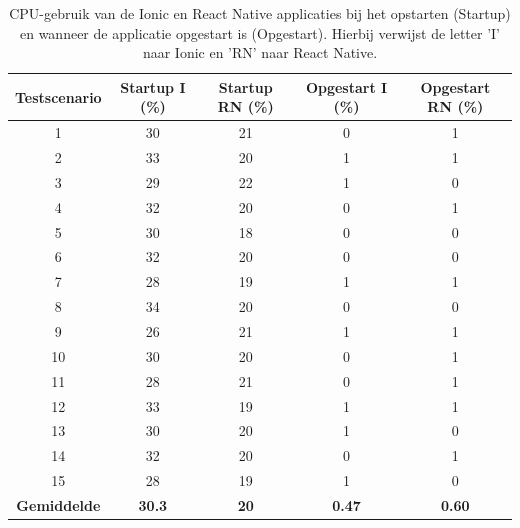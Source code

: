 


\begin{table}[htbp]
  \centering
  \footnotesize
  \begin{tabular}{|c|c|c|c|c|}
      \hline
      \textbf{Testscenario} & \textbf{Startup I (\%)} & \textbf{Startup RN (\%)} & \textbf{Opgestart I (\%)} & \textbf{Opgestart RN (\%)} \\
      \hline
      1 & 30 & 21 & 0 & 1 \\
      \hline
      2 & 33 & 20 & 1 & 1 \\
      \hline
      3 & 29 & 22 & 1 & 0 \\
      \hline
      4 & 32 & 20 & 0 & 1 \\
      \hline
      5 & 30 & 18 & 0 & 0 \\
      \hline
      6 & 32 & 20 & 0 & 0 \\
      \hline
      7 & 28 & 19 & 1 & 1 \\
      \hline
      8 & 34 & 20 & 0 & 0 \\
      \hline
      9 & 26 & 21 & 1 & 1 \\
      \hline
      10 & 30 & 20 & 0 & 1 \\
      \hline
      11 & 28 & 21 & 0 & 1 \\
      \hline
      12 & 33 & 19 & 1 & 1 \\
      \hline
      13 & 30 & 20 & 1 & 0 \\
      \hline
      14 & 32 & 20 & 0 & 1 \\
      \hline
      15 & 28 & 19 & 1 & 0 \\
      \hline
      \textbf{Gemiddelde} & \textbf{30.3} & \textbf{20} & \textbf{0.47} & \textbf{0.60} \\
      \hline
  \end{tabular}
  \caption{CPU-gebruik van de Ionic en React Native applicaties bij het opstarten (Startup) en wanneer de applicatie opgestart is (Opgestart). Hierbij verwijst de letter 'I' naar Ionic en 'RN' naar React Native.}
  \label{tab:cpu1}
\end{table}

